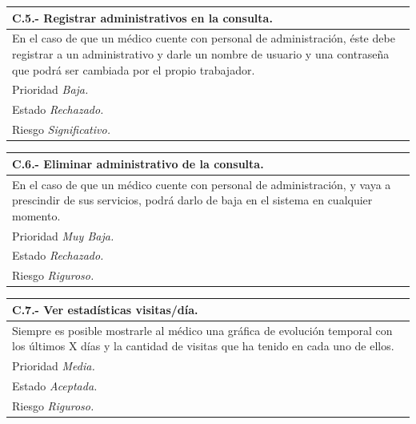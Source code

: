\documentclass[a4paper,oneside,11pt]{book}
\begin{document}
\begin{center}
\begin{tabulary}{15cm}{|L|}
	\hline
		\bf{C.5.- Registrar administrativos en la consulta.} \\
	\hline
		En el caso de que un médico cuente con personal de administración, éste debe registrar a un administrativo y darle un nombre de usuario y una contraseña que podrá ser cambiada por el propio trabajador. \\
	\hline
		Prioridad \textit{Baja.} \\
	\hline
		Estado \textit{Rechazado.} \\
	\hline
		Riesgo \textit{Significativo.} \\
	\hline
\end{tabulary}
\end{center}

\begin{center}
\begin{tabulary}{15cm}{|L|}
	\hline
		\bf{C.6.- Eliminar administrativo de la consulta.} \\
	\hline
		En el caso de que un médico cuente con personal de administración, y vaya a prescindir de sus servicios, podrá darlo de baja en el sistema en cualquier momento. \\
	\hline
		Prioridad \textit{Muy Baja.} \\
	\hline
		Estado \textit{Rechazado.} \\
	\hline
		Riesgo \textit{Riguroso.} \\
	\hline
\end{tabulary}
\end{center}

\begin{center}
\begin{tabulary}{15cm}{|L|}
	\hline
		\bf{C.7.- Ver estadísticas visitas/día.} \\
	\hline
		Siempre es posible mostrarle al médico una gráfica de evolución temporal con los últimos X días y la cantidad de visitas que ha tenido en cada uno de ellos. \\
	\hline
		Prioridad \textit{Media.} \\
	\hline
		Estado \textit{Aceptada.} \\
	\hline
		Riesgo \textit{Riguroso.} \\
	\hline
\end{tabulary}
\end{center}
\end{document}
